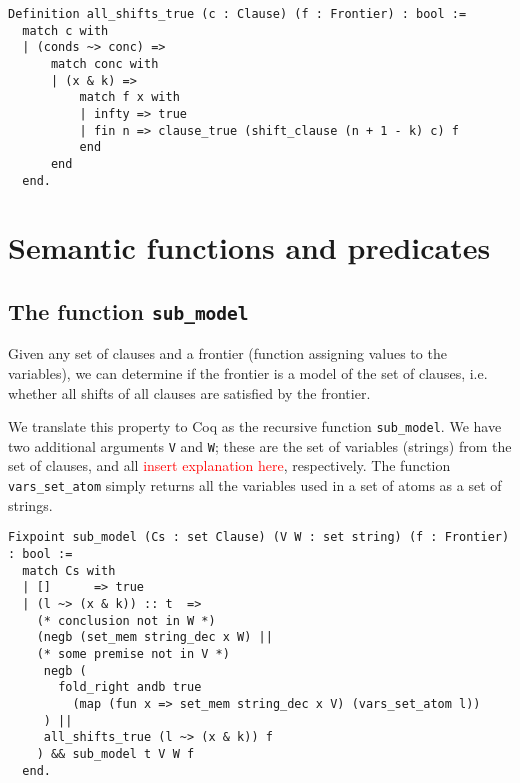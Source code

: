 \begin{minipage}{\linewidth}
\begin{lstlisting}[language=Coq, label={lst:all_shifts_true}, caption={\lstinline{all_shifts_true} in Coq}]
Definition all_shifts_true (c : Clause) (f : Frontier) : bool :=
  match c with
  | (conds ~> conc) =>
      match conc with
      | (x & k) =>
          match f x with
          | infty => true
          | fin n => clause_true (shift_clause (n + 1 - k) c) f
          end
      end
  end.
\end{lstlisting}
\end{minipage}

\section{Semantic functions and predicates}

\subsection{The function \lstinline{sub_model}}

Given any set of clauses and a frontier (function assigning values to the variables),
we can determine if the frontier is a model of the set of clauses, i.e.
whether all shifts of all clauses are satisfied by the frontier.

We translate this property to Coq as the recursive function \lstinline{sub_model}.
We have two additional arguments \lstinline{V} and \lstinline{W}; these are
the set of variables (strings) from the set of clauses, and all \textcolor{red}{insert explanation here}, respectively.
The function \lstinline{vars_set_atom} simply returns all the variables used
in a set of atoms as a set of strings.

\begin{minipage}{\linewidth}
\begin{lstlisting}[language=Coq, label={lst:sub_model_def}, caption={The function \lstinline{sub_model} in Coq}]
Fixpoint sub_model (Cs : set Clause) (V W : set string) (f : Frontier) : bool :=
  match Cs with
  | []      => true
  | (l ~> (x & k)) :: t  =>
    (* conclusion not in W *)
    (negb (set_mem string_dec x W) ||
    (* some premise not in V *)
     negb (
       fold_right andb true
         (map (fun x => set_mem string_dec x V) (vars_set_atom l))
     ) ||
     all_shifts_true (l ~> (x & k)) f
    ) && sub_model t V W f
  end.
\end{lstlisting}
\end{minipage}


